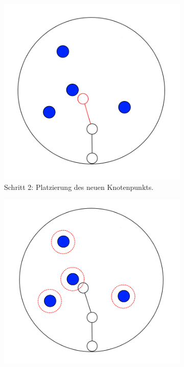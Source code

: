 \begin{figure} [hbtp]
	\begin{subfigure}[t]{.3\textwidth}
		\centering
		\includegraphics[width=\linewidth]{images/SCA_Basic4.png}
		\caption{Schritt 2: Platzierung des neuen Knotenpunkts.}
		\label{subfig:SCA_Basic4}
	\end{subfigure}
	\hspace{.03\textwidth}
	\begin{subfigure}[t]{.3\textwidth}
		\centering
		\includegraphics[width=\linewidth]{images/SCA_Basic5.png}

\end{subfigure}
\end{figure}
